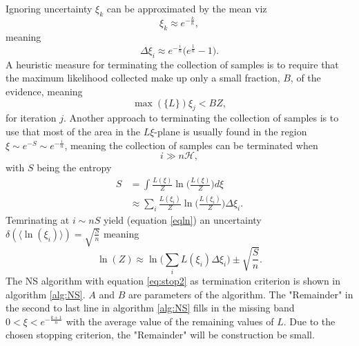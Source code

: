 \documentclass[fleqn,usenatbib,nofootinbib]{revtex4-2}
\begin{document}
\begin{appendices}
\begin{equation}
			\label{eqln}
		\end{equation}
		Ignoring uncertainty $\xi_k$ can be approximated by the mean viz
		\begin{equation}
			\xi_k\approx e^{-\frac{k}{n}},
		\end{equation}
		meaning
		\begin{equation}
			\Delta \xi_i\approx e^{-\frac{i}{n}}\big(e^{\frac{1}{n}}-1\big).
		\end{equation}
		A heuristic measure for terminating the collection of samples is to require that the maximum likelihood collected make up only a small fraction, $B$, of the evidence, meaning
		\begin{equation}
			\max(\{L\})\xi_j < BZ,
		\end{equation}
		for iteration $j$. Another approach to terminating the collection of samples is to use that most of the area in the $L\xi$-plane is usually found in the region~\citep{skilling2004,skilling2006} $\xi \sim e^{-S}\sim e^{-\frac{i}{n}}$, meaning the collection of samples can be terminated when
		\begin{equation}
			i\gg n\mathcal{H},
			\label{eq:stop2}
		\end{equation}
		with $S$ being the entropy~\citep{skilling2004}
		\begin{equation}
			\begin{split}
				S &= \int \frac{L(\xi)}{Z}\ln\bigg(\frac{L(\xi)}{Z}\bigg)d\xi\\
				& \approx \sum_i\frac{L(\xi_i)}{Z}\ln\bigg(\frac{L(\xi_i)}{Z}\bigg)\Delta \xi_i.
			\end{split}
		\end{equation}
		Temrinating at $i\sim nS$ yield (equation \eqref{eqln}) an uncertainty $\delta (\langle\ln(\xi_i)\rangle)=\sqrt{\frac{S}{n}}$ meaning
		\begin{equation}
			\ln(Z)\approx \ln\bigg(\sum_{i}L(\xi_i)\Delta \xi_i\bigg)\pm \sqrt{\frac{S}{n}}.
		\end{equation}
		The NS algorithm with equation \eqref{eq:stop2} as termination criterion is shown in algorithm \ref{alg:NS}. $A$ and $B$ are parameters of the algorithm. The "Remainder" in the second to last line in algorithm \ref{alg:NS} fills in the missing band $0<\xi<e^{-\frac{k+1}{n}}$ with the average value of the remaining values of $L$. Due to the chosen stopping criterion, the "Remainder" will be construction be small.
		

\end{appendices}
\end{document}
